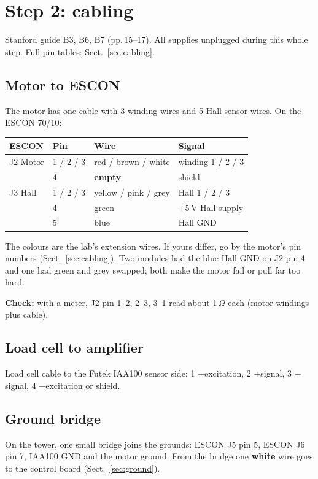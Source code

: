 \section{Step 2: cabling}\label{sec:walk-cabling}
Stanford guide B3, B6, B7 (pp.\,15--17). All supplies unplugged during this whole step. Full pin tables:
Sect.~\ref{sec:cabling}.

\subsection{Motor to ESCON}
The motor has one cable with 3 winding wires and 5 Hall-sensor wires. On the ESCON 70/10:
\begin{table}[H]\centering\small
\begin{tabular}{llll}
\toprule
ESCON & Pin & Wire & Signal \\
\midrule
J2 Motor & 1 / 2 / 3 & red / brown / white & winding 1 / 2 / 3 \\
         & 4 & \textbf{empty} & shield \\
J3 Hall  & 1 / 2 / 3 & yellow / pink / grey & Hall 1 / 2 / 3 \\
         & 4 & green & +5\,V Hall supply \\
         & 5 & blue  & Hall GND \\
\bottomrule
\end{tabular}
\end{table}
The colours are the lab's extension wires. If yours differ, go by the motor's pin numbers
(Sect.~\ref{sec:cabling}). Two modules had the blue Hall GND on J2 pin 4 and one had green and grey swapped;
both make the motor fail or pull far too hard.

\textbf{Check:} with a meter, J2 pin 1--2, 2--3, 3--1 read about 1\,$\Omega$ each (motor windings plus cable).

\subsection{Load cell to amplifier}
Load cell cable to the Futek IAA100 sensor side: 1 +excitation, 2 +signal, 3 $-$signal, 4 $-$excitation or
shield. 

\subsection{Ground bridge}
On the tower, one small bridge joins the grounds: ESCON J5 pin 5, ESCON J6 pin 7, IAA100 GND and the motor
ground. From the bridge one \textbf{white} wire goes to the control board (Sect.~\ref{sec:ground}).


